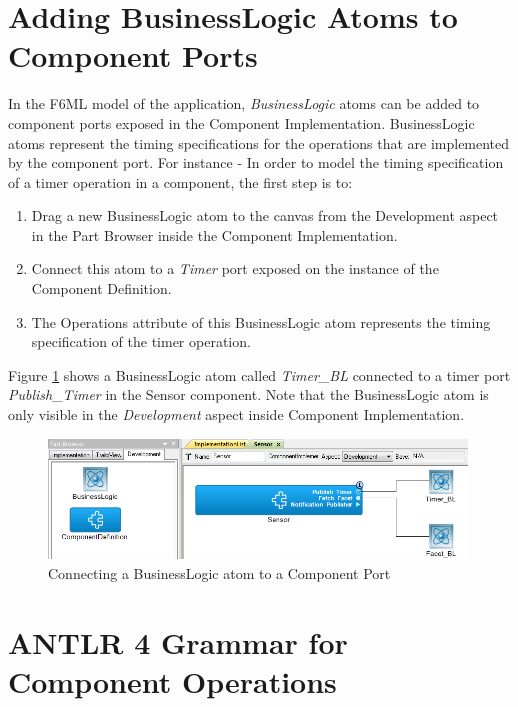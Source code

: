 \section{Adding BusinessLogic Atoms to Component Ports}

In the F6ML model of the application, \emph{BusinessLogic} atoms can be added to component ports exposed in the Component Implementation. BusinessLogic atoms represent the timing specifications for the operations that are implemented by the component port. For instance - In order to model the timing specification of a timer operation in a component, the first step is to:
\begin{enumerate}
\item Drag a new BusinessLogic atom to the canvas from the Development aspect in the Part Browser inside the Component Implementation.
\item Connect this atom to a \emph{Timer} port exposed on the instance of the Component Definition.
\item The Operations attribute of this BusinessLogic atom represents the timing specification of the timer operation.
\end{enumerate}

Figure \ref{fig:tpa_timerbl} shows a BusinessLogic atom called \emph{Timer\_BL} connected to a timer port \emph{Publish\_Timer} in the Sensor component. Note that the BusinessLogic atom is only visible in the \emph{Development} aspect inside Component Implementation.

\begin{figure}[ht]
\centering
\includegraphics[width=0.99\textwidth]{./figs/TPA_TIMERBL}
\caption{Connecting a BusinessLogic atom to a Component Port}
\label{fig:tpa_timerbl}
\vspace{-0.2in}
\end{figure}
\vspace{0.1in}

\section{ANTLR 4 Grammar for Component Operations}

